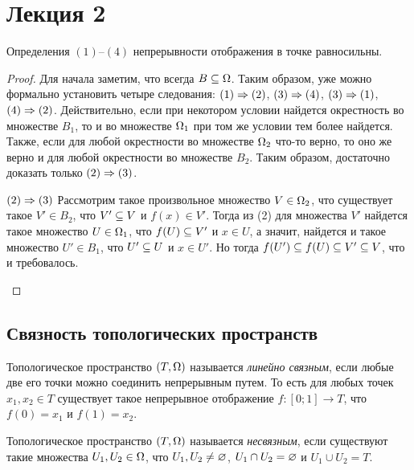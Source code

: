 \documentclass[main]{subfiles}
\begin{document}
\section{Лекция 2}

\begin{theorem}
	Определения $(1)$--$(4)$ непрерывности отображения в точке равносильны.
\end{theorem}

\begin{proof}
	Для начала заметим, что всегда $ B \subseteq \Omega $. Таким образом, уже можно формально установить
	четыре следования: $(1)\Rightarrow(2)$, $(3)\Rightarrow(4)$, $(3)\Rightarrow(1)$, $(4)\Rightarrow(2)$. Действительно, если при некотором условии
	найдется окрестность во множестве $ B_1 $, то и во множестве $ \Omega_1 $ при том же условии тем более найдется.
	Также, если для любой окрестности во множестве $ \Omega_2 $ что-то верно, то оно же верно и для любой окрестности во
	множестве $ B_2 $. Таким образом, достаточно доказать только $(2)\Rightarrow(3)$.
	\begin{multiproof}
		\item[$(2)\Rightarrow(3)$] Рассмотрим такое произвольное множество $ V \in \Omega_2 $, что существует такое $ V' \in B_2 $,
			что $ V' \subseteq V $ и $ f(x) \in V' $. Тогда из (2) для множества $ V' $ найдется такое множество
			$ U \in \Omega_1 $, что $ f(U) \subseteq V' $ и $ x \in U $, а значит, найдется и такое множество $ U' \in B_1 $,
			что $ U' \subseteq U $ и $ x \in U' $. Но тогда $ f(U') \subseteq f(U) \subseteq V' \subseteq V $, что и требовалось.
	\end{multiproof}
\end{proof}

\subsection{Связность топологических пространств}

\begin{definition}
	Топологическое пространство $ (T, \Omega) $ называется \emph{линейно связным}, если любые две его точки можно соединить
	непрерывным путем. То есть для любых точек $ x_1, x_2 \in T $ существует такое непрерывное отображение
	$ f \colon [0; 1] \to T $, что $ f(0) = x_1 $ и $ f(1) = x_2 $.
\end{definition}

\begin{definition}
	Топологическое пространство $ (T, \Omega) $ называется \emph{несвязным}, если существуют такие множества
	$ U_1, U_2 \in \Omega $, что $ U_1, U_2 \neq \varnothing $, $ U_1 \cap U_2 = \varnothing $ и $ U_1 \cup U_2 = T $.
\end{definition}
\end{document}

